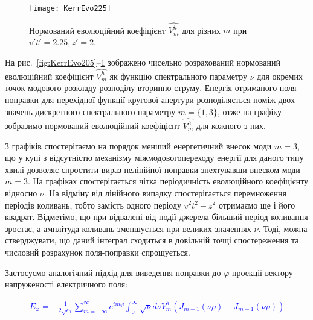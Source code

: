 \begin{figure}[htbp] \begin{center}
\texttt{[image: KerrEvo225]}
\caption{Нормований еволюційний коефіцієнт $ \hat{V_m^h} $ для 
різних $ m $ при $ v't' = 2.25, z' = 2 $.} 
\label{fig:KerrEvo225}
\end{center} \end{figure}

На рис.~\ref{fig:KerrEvo205}--\ref{fig:KerrEvo225} зображено чисельно 
розрахований нормований еволюційний коефіцієнт $ \hat{V_m^h} $ як функцію 
спектрального параметру $ \nu $ для окремих точок модового розкладу розподілу 
вторинно струму. Енергія отриманого поля-поправки для перехідної функції 
кругової апертури розподіляється поміж двох значень дискретного спектрального 
параметру $ m = \{ 1, 3\} $, отже на графіку зобразимо нормований еволюційний 
коефіцієнт $ \hat{V_m^h} $ для кожного з них.

З графіків спостерігаємо на порядок менший енергетичний внесок моди $ m = 3 $, 
що у купі з відсутністю механізму міжмодовогопереходу енергії для даного типу 
хвилі дозволяє спростити вираз нелінійної поправки знехтувавши внеском моди 
$ m = 3 $. На графіках спостерігається чітка періодичність еволюційного 
коефіцієнту відносно $ \nu $. На відміну від лінійного випадку спостерігається 
перемноження періодів коливань, тобто замість одного періоду $ v^2t^2 - z^2 $ 
отримаємо ще і його квадрат. Відметімо, що при відвалені від події джерела 
більший період коливання зростає, а амплітуда коливань зменшується при 
великих значеннях $ \nu $. Тоді, можна стверджувати, що даний інтеграл 
сходиться в довільній точці спостереження та числовий розрахунок 
поля-поправки спрощується.

Застосуємо аналогічний підхід для виведення поправки до $ \varphi $ проекції 
вектору напруженості електричного поля:

\textcolor{blue} { \begin{equation*} \begin{aligned}
E_\varphi = - \frac{1}{2 \sqrt{\epsilon_0}} \sum_{m=-\infty}^{\infty} 
e^{im\varphi} \int_{0}^{\infty} \sqrt{\nu} d \nu 
V_m^h \left( J_{m-1} (\nu \rho) - J_{m+1} (\nu \rho) \right)
\end{aligned} \end{equation*} }

